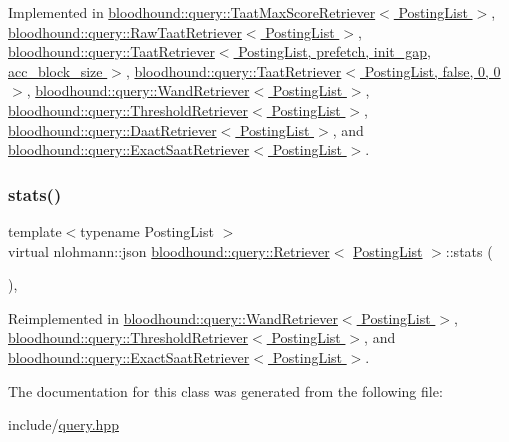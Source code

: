 Implemented in \hyperlink{classbloodhound_1_1query_1_1TaatMaxScoreRetriever_af4d96478395b58527969526c3068e7b9}{bloodhound\+::query\+::\+Taat\+Max\+Score\+Retriever$<$ Posting\+List $>$}, \hyperlink{classbloodhound_1_1query_1_1RawTaatRetriever_aafaaf842fdaef297a255e28766af2c0d}{bloodhound\+::query\+::\+Raw\+Taat\+Retriever$<$ Posting\+List $>$}, \hyperlink{classbloodhound_1_1query_1_1TaatRetriever_a58284f19458689021a083c07ea627485}{bloodhound\+::query\+::\+Taat\+Retriever$<$ Posting\+List, prefetch, init\+\_\+gap, acc\+\_\+block\+\_\+size $>$}, \hyperlink{classbloodhound_1_1query_1_1TaatRetriever_a58284f19458689021a083c07ea627485}{bloodhound\+::query\+::\+Taat\+Retriever$<$ Posting\+List, false, 0, 0 $>$}, \hyperlink{classbloodhound_1_1query_1_1WandRetriever_a5f3068bc363c16c5b7255a925ea5af8c}{bloodhound\+::query\+::\+Wand\+Retriever$<$ Posting\+List $>$}, \hyperlink{classbloodhound_1_1query_1_1ThresholdRetriever_a06750450e1246e755ebad2d5dac6e8a8}{bloodhound\+::query\+::\+Threshold\+Retriever$<$ Posting\+List $>$}, \hyperlink{classbloodhound_1_1query_1_1DaatRetriever_ab80b4867fc263827dc2fdbe0965a2e8c}{bloodhound\+::query\+::\+Daat\+Retriever$<$ Posting\+List $>$}, and \hyperlink{classbloodhound_1_1query_1_1ExactSaatRetriever_aced2763cc2a4c12838fef4a20759049e}{bloodhound\+::query\+::\+Exact\+Saat\+Retriever$<$ Posting\+List $>$}.

\mbox{\label{classbloodhound_1_1query_1_1Retriever_a58da32a5139b980ba874f8b5e6bb89ec}} 
\subsubsection{\texorpdfstring{stats()}{stats()}}
{\footnotesize\ttfamily template$<$typename Posting\+List $>$ \\
virtual nlohmann\+::json \hyperlink{classbloodhound_1_1query_1_1Retriever}{bloodhound\+::query\+::\+Retriever}$<$ \hyperlink{classbloodhound_1_1PostingList}{Posting\+List} $>$\+::stats (\begin{DoxyParamCaption}{ }\end{DoxyParamCaption})\hspace{0.3cm}{\ttfamily [inline]}, {\ttfamily [virtual]}}



Reimplemented in \hyperlink{classbloodhound_1_1query_1_1WandRetriever_a1e593c2cddb2ca4f2415c59ca26e6a36}{bloodhound\+::query\+::\+Wand\+Retriever$<$ Posting\+List $>$}, \hyperlink{classbloodhound_1_1query_1_1ThresholdRetriever_aa21e5b44d70bfdf058e5f9c5a1abc008}{bloodhound\+::query\+::\+Threshold\+Retriever$<$ Posting\+List $>$}, and \hyperlink{classbloodhound_1_1query_1_1ExactSaatRetriever_a716838f463f124964e76f48bc37d32cc}{bloodhound\+::query\+::\+Exact\+Saat\+Retriever$<$ Posting\+List $>$}.



The documentation for this class was generated from the following file\+:\begin{DoxyCompactItemize}
\item 
include/\hyperlink{query_8hpp}{query.\+hpp}\end{DoxyCompactItemize}
